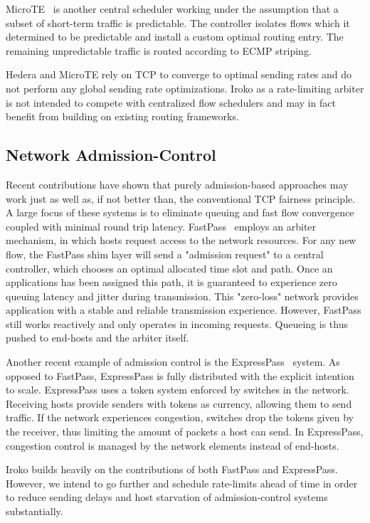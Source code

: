 MicroTE~\cite{microte} is another central scheduler working under the 
assumption that a subset of short-term traffic is predictable. The controller 
isolates flows which it determined to be predictable and install a custom 
optimal routing entry. The remaining unpredictable traffic is routed according 
to ECMP striping.

Hedera and MicroTE rely on TCP to converge to optimal sending rates and do not 
perform any global sending rate optimizations.
Iroko as a rate-limiting arbiter is not intended to compete with centralized 
flow schedulers and may in fact benefit from building on existing routing 
frameworks.

\subsection{Network Admission-Control}
Recent contributions have shown that purely admission-based approaches 
may work just as well as, if not better than, the conventional TCP fairness 
principle. A large focus of these systems is to eliminate queuing and fast flow 
convergence coupled with minimal round trip latency.
FastPass~\cite{fastpass} employs an arbiter mechanism, in which hosts request 
access to the network resources. For any new flow, the FastPass shim layer will 
send a "admission request" to a central controller, which chooses an optimal 
allocated time slot and path. Once an applications has been assigned this path, 
it is guaranteed to experience zero queuing latency and jitter during 
transmission. This "zero-loss" network provides application with a stable and 
reliable transmission experience. However, FastPass still works reactively and 
only operates in incoming requests. Queueing is thus pushed to end-hosts and 
the arbiter itself.

Another recent example of admission control is the 
ExpressPass~\cite{expresspass} system. As opposed to FastPass, ExpressPass is 
fully distributed with the explicit intention to scale. ExpressPass uses a 
token system enforced by switches in the network. Receiving hosts provide 
senders with tokens as currency, allowing them to send traffic. If the network 
experiences congestion, switches drop the tokens given by the receiver, thus 
limiting the amount of packets a host can send. In ExpressPass, congestion 
control is managed by the network elements instead of end-hosts.

Iroko builds heavily on the contributions of both FastPass and ExpressPass. 
However, we intend to go further and schedule rate-limits ahead of time in 
order to reduce sending delays and host starvation of admission-control systems 
substantially.



